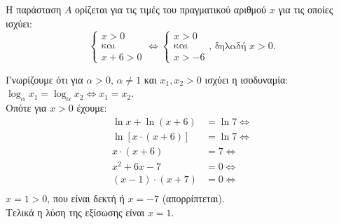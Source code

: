 \begin{alist}
\item Η παράσταση $A$ ορίζεται για τις τιμές του πραγματικού αριθμού $x$ για τις οποίες ισχύει:
\[\begin{cases} x > 0 \\ \text{και} \\ x + 6 > 0 \end{cases} \Leftrightarrow \begin{cases} x > 0 \\ \text{και} \\ x > -6 \end{cases}\text{, δηλαδή } x > 0.\]
\item Γνωρίζουμε ότι για $\alpha > 0$, $\alpha \neq 1$ και $x_1, x_2 > 0$ ισχύει η ισοδυναμία: $\log_\alpha x_1 = \log_\alpha x_2 \Leftrightarrow x_1 = x_2$. \\
Οπότε για $x > 0$ έχουμε:
\begin{align*}
\ln x + \ln(x + 6) &= \ln 7 \Leftrightarrow \\
\ln[x\cdot(x + 6)] &= \ln 7 \Leftrightarrow \\
x\cdot(x + 6) &= 7 \Leftrightarrow \\
x^2 + 6x - 7 &= 0 \Leftrightarrow \\
(x - 1)\cdot(x + 7) &= 0 \Leftrightarrow \\
\end{align*}
$x = 1 > 0$, που είναι δεκτή ή $x = -7$ (απορρίπτεται). \\
Τελικά η λύση της εξίσωσης είναι $x = 1$.
\end{alist}

